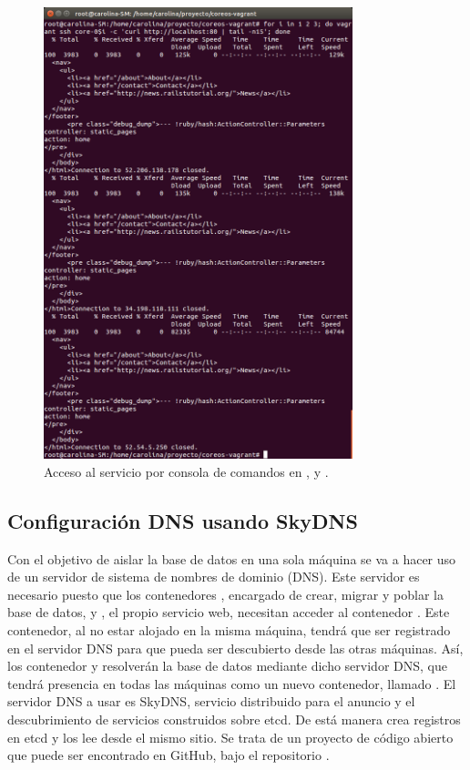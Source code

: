\begin{figure}[H]
\centering
\includegraphics[width=0.8\textwidth]{images/figures/curl-fleet.png}
\caption{Acceso al servicio por consola de comandos en ,  y .\label{fig:figure_placement_example}}
\end{figure}

\subsection{Configuración DNS usando SkyDNS}

Con el objetivo de aislar la base de datos en una sola máquina se va a hacer uso de un servidor de sistema de nombres de dominio (DNS). Este servidor es necesario puesto que los contenedores , encargado de crear, migrar y poblar la base de datos, y , el propio servicio web, necesitan acceder al contenedor . Este contenedor, al no estar alojado en la misma máquina, tendrá que ser registrado en el servidor DNS para que pueda ser descubierto desde las otras máquinas. Así, los contenedor  y  resolverán la base de datos mediante dicho servidor DNS, que tendrá presencia en todas las máquinas como un nuevo contenedor, llamado . El servidor DNS a usar es SkyDNS, servicio distribuido para el anuncio y el descubrimiento de servicios construidos sobre etcd. De está manera crea registros en etcd y los lee desde el mismo sitio. Se trata de un proyecto de código abierto que puede ser encontrado en GitHub, bajo el repositorio .

